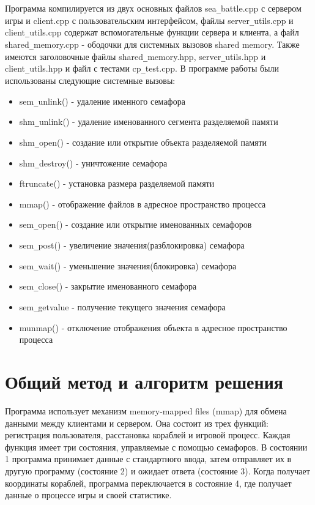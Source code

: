 \documentclass[a4paper, 14pt]{article}
\begin{document}
Программа компилируется из двух основных файлов sea\texttt{\_}battle.cpp с сервером игры и client.cpp с пользовательским интерфейсом, файлы server\texttt{\_}utils.cpp и client\texttt{\_}utils.cpp содержат вспомогательные функции сервера и клиента, а файл shared\texttt{\_}memory.cpp - ободочки для системных вызовов shared memory. Также имеются заголовочные файлы shared\texttt{\_}memory.hpp, server\texttt{\_}utils.hpp и client\texttt{\_}utils.hpp и файл с тестами cp\texttt{\_}test.cpp. В программе работы были использованы следующие системные вызовы:

\begin{itemize}
    \item sem\texttt{\_}unlink() - удаление именного семафора
    \item shm\texttt{\_}unlink() - удаление именованного сегмента разделяемой памяти 
    \item shm\texttt{\_}open() - создание или открытие объекта разделяемой памяти 
    \item shm\texttt{\_}destroy() - уничтожение семафора
    \item ftruncate() - установка размера разделяемой памяти
    \item mmap() - отображение файлов в адресное пространство процесса 
    \item sem\texttt{\_}open() - создание или открытие именованных семафоров
    \item sem\texttt{\_}post() - увеличение значения(разблокировка) семафора
    \item sem\texttt{\_}wait() - уменьшение значения(блокировка) семафора
    \item sem\texttt{\_}close() - закрытие именованного семафора
    \item sem\texttt{\_}getvalue - получение текущего значения семафора
    \item munmap() - отключение отображения объекта в адресное пространство процесса
\end{itemize}

\section*{Общий метод и алгоритм решения}

Программа использует механизм memory-mapped files (mmap) для обмена данными между клиентами и сервером. Она состоит из трех функций: регистрация пользователя, расстановка кораблей и игровой процесс. Каждая функция имеет три состояния, управляемые с помощью семафоров. В состоянии 1 программа принимает данные с стандартного ввода, затем отправляет их в другую программу (состояние 2) и ожидает ответа (состояние 3). Когда получает координаты кораблей, программа переключается в состояние 4, где получает данные о процессе игры и своей статистике.
\end{document}
